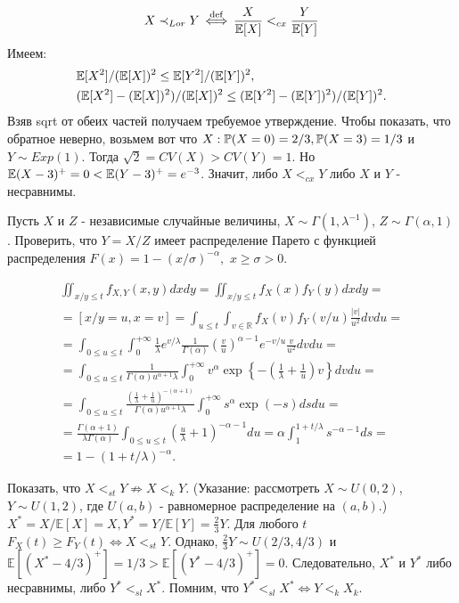 $$X \prec_{Lor} Y \iffdef \frac{X}{\E[X]} <_{cx} \frac{Y}{\E[Y]}$$
Имеем: 
\begin{align}
    & \E [X^2] / (\E [X])^2 \leq \E[Y^2 ]/ (\E[Y])^2, \\
    & (\E[X^2] - (\E[X])^2)/ (\E[X])^2 \leq (\E[Y^2] - (\E[Y])^2) / (\E[Y])^2.
\end{align}
Взяв sqrt от обеих частей получаем требуемое утверждение.
Чтобы показать, что обратное неверно, возьмем вот что $X: \P(X=0) = 2/3, \P (X = 3) = 1/3$ и $Y \sim Exp(1).$ Тогда $\sqrt 2 = CV(X) > CV(Y) = 1 $. Но $\E(X - 3)^+ = 0 < \E(Y - 3)^+ = e^{-3}$. Значит, либо $X<_{cx} Y$ либо $X$ и $Y$ - несравнимы. 

\problem{}
Пусть $X$ и $Z$ - независимые случайные величины, $X \sim \Gamma(1, \lambda^{-1})$, $Z \sim \Gamma(\alpha, 1)$. Проверить, что $Y = X/Z$ имеет распределение Парето с функцией распределения $F(x) = 1 - (x/\sigma)^{-\alpha},$ $x \geq \sigma > 0$.
\solution{}

\begin{multline*}
    \iint_{x/y \leq t} f_{X,Y}(x,y)dxdy = \iint_{x/y \leq t} f_{X}(x) f_Y(y)dxdy =\\= \left[x/y = u, x = v \right] =
    \int_{u\leq t}\int_{v \in \mathbb R}f_X(v)f_Y(v/u)\frac{|v|}{u^2}dvdu =\\= 
    \int_{0\leq u\leq t}\int_0^{+\infty} \frac{1}{\lambda}e^{v/\lambda} \frac{1}{\Gamma(\alpha)}\left( \frac{v}{u}\right)^{\alpha - 1} e^{-v/u} \frac{v}{u^2} dv du =\\= 
    \int_{0\leq u\leq t}\frac{1}{\Gamma(\alpha) u^{\alpha +1} \lambda}\int_0^{+\infty} v^\alpha \exp\left\{-\left(\frac1\lambda + \frac1u\right)v\right\} dv du =\\= 
    \int_{0\leq u\leq t}\frac{(\frac1\lambda + \frac1u)^{-(\alpha +1)}}{\Gamma(\alpha) u^{\alpha +1} \lambda}\int_0^{+\infty} s^\alpha \exp\left(-s\right) ds du =\\= \frac{\Gamma(\alpha + 1)}{\lambda\Gamma(\alpha)} \int_{0\leq u\leq t} \left(\frac u\lambda + 1 \right)^{-\alpha - 1}du = \alpha \int_1^{1+ t/\lambda} s^{-\alpha - 1}ds = \\ = 1 - (1 + t/\lambda)^{-\alpha}.
\end{multline*}

\problem{}
Показать, что $ X <_{st} Y \not\Rightarrow X <_k Y $. (Указание: рассмотреть $X \sim U(0, 2)$, $Y \sim U(1, 2)$, где $U(a, b)$ - равномерное
распределение на $(a, b)$.)
\solution{}
$X^* = X/\mathbb E[X] = X, Y^* = Y/\mathbb E [Y] = \frac{2}{3}Y$. Для любого $t$ $F_X(t)\geq F_Y(t) \iff X<_{st} Y$. Однако, $\frac{2}{3}Y \sim U(2/3, 4/3)$ и $\mathbb E[(X^* - 4/3)^+] = 1/3 > \mathbb E [(Y^* - 4/3)^+] = 0$. Следовательно, $X^*$ и $Y^*$ либо несравнимы, либо $Y^* <_{sl} X^*$. Помним, что $Y^* <_{sl} X^* \Leftrightarrow Y <_{k} X_{k}$.

